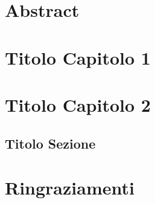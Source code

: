 \documentclass[11pt,oneside,a4paper]{book}
\begin{document}
\newpage
\thispagestyle{empty}
\begin{flushright}
\null{}
{\calligra{}}
\null
\end{flushright}


\newpage
\tableofcontents
\thispagestyle{empty}

\newpage
\setcounter{page}{1}
\chapter*{Abstract}
    
    
\chapter{Titolo Capitolo 1}
    
    
    
\chapter{Titolo Capitolo 2}
\section{Titolo Sezione}
    

    


    

\printbibliography
    

    
\newpage


\thispagestyle{empty}
\null
\newpage
\chapter*{Ringraziamenti}

\end{document}
